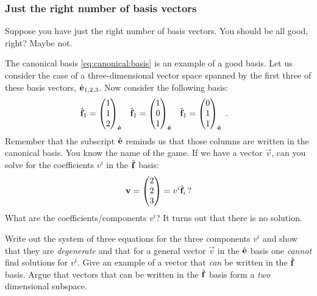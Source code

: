 \documentclass[12pt, oneside]{report}    %
\begin{document}
\subsubsection{Just the right number of basis vectors}

Suppose you have just the right number of basis vectors. You should be all good, right? Maybe not. 
\begin{example}
The canonical basis \eqref{eq:canonical:basis} is an example of a good basis. Let us consider the case of a three-dimensional vector space spanned by the first three of these basis vectors, $\hat{\mathbf{e}}_{1,2,3}$. Now consider the following basis:
\begin{align}
    \hat{\mathbf{f}}_1 &=
    \begin{pmatrix}
    1 \\ 1 \\ 2  
    \end{pmatrix}_{\hat{\mathbf{e}}}
    &
    \hat{\mathbf{f}}_1 &=
    \begin{pmatrix}
    1 \\ 0 \\ 1  
    \end{pmatrix}_{\hat{\mathbf{e}}}
    &
    \hat{\mathbf{f}}_1 &=
    \begin{pmatrix}
    0 \\ 1 \\ 1  
    \end{pmatrix}_{\hat{\mathbf{e}}} \ .
    \label{eq:eg:basis:lin:dependent}
\end{align}
Remember that the subscript $\hat{\mathbf{e}}$ reminds us that those columns are written in the canonical basis.
You know the name of the game. If we have a vector $\vec{v}$, can you solve for the coefficients $v^i$ in the $\hat{\mathbf{f}}$ basis:
\begin{align}
    \mathbf{v} = 
    \begin{pmatrix}
        2 \\ 2 \\ 3
    \end{pmatrix}
    = v^i \hat{\mathbf{f}}_i \, ?
\end{align}
What are the coefficients/components $v^i$? It turns out that there is no solution.
\end{example}
\begin{exercise}
Write out the system of three equations for the three components $v^i$ and show that they are \emph{degenerate} and that for a general vector $\vec{v}$ in the $\hat{\mathbf{e}}$ basis one \emph{cannot} find solutions for $v^i$. Give an example of a vector that \emph{can} be written in the $\hat{\mathbf{f}}$ basis. Argue that vectors that can be written in the $\hat{\mathbf{f}}$ basis form a \emph{two} dimensional subspace.
\end{exercise}
\end{document}
